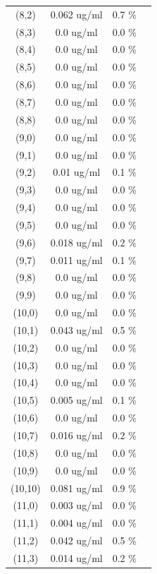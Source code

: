 \documentclass{article}
\begin{document}
\begin{tabular}{c c c c}
(8,2)&        0.062 ug/ml        &0.7 \%\\
(8,3)&        0.0 ug/ml        &0.0 \%\\
(8,4)&        0.0 ug/ml        &0.0 \%\\
(8,5)&        0.0 ug/ml        &0.0 \%\\
(8,6)&        0.0 ug/ml        &0.0 \%\\
(8,7)&        0.0 ug/ml        &0.0 \%\\
(8,8)&        0.0 ug/ml        &0.0 \%\\
(9,0)&        0.0 ug/ml        &0.0 \%\\
(9,1)&        0.0 ug/ml        &0.0 \%\\
(9,2)&        0.01 ug/ml        &0.1 \%\\
(9,3)&        0.0 ug/ml        &0.0 \%\\
(9,4)&        0.0 ug/ml        &0.0 \%\\
(9,5)&        0.0 ug/ml        &0.0 \%\\
(9,6)&        0.018 ug/ml        &0.2 \%\\
(9,7)&        0.011 ug/ml        &0.1 \%\\
(9,8)&        0.0 ug/ml        &0.0 \%\\
(9,9)&        0.0 ug/ml        &0.0 \%\\
(10,0)&        0.0 ug/ml        &0.0 \%\\
(10,1)&        0.043 ug/ml        &0.5 \%\\
(10,2)&        0.0 ug/ml        &0.0 \%\\
(10,3)&        0.0 ug/ml        &0.0 \%\\
(10,4)&        0.0 ug/ml        &0.0 \%\\
(10,5)&        0.005 ug/ml        &0.1 \%\\
(10,6)&        0.0 ug/ml        &0.0 \%\\
(10,7)&        0.016 ug/ml        &0.2 \%\\
(10,8)&        0.0 ug/ml        &0.0 \%\\
(10,9)&        0.0 ug/ml        &0.0 \%\\
(10,10)&        0.081 ug/ml        &0.9 \%\\
(11,0)&        0.003 ug/ml        &0.0 \%\\
(11,1)&        0.004 ug/ml        &0.0 \%\\
(11,2)&        0.042 ug/ml        &0.5 \%\\
(11,3)&        0.014 ug/ml        &0.2 \%\\

\end{tabular}
\end{document}
